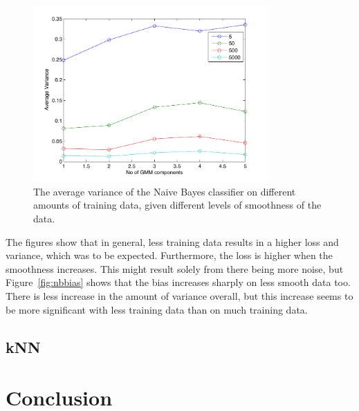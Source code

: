 \documentclass[a4paper]{article}
\begin{document}
\begin{figure}[H!]
    \centering
    \includegraphics[width=0.8\textwidth]{nb_variance_1-5c.pdf}
    \caption{The average variance of the Naive Bayes classifier on different amounts of training data, given different levels of smoothness of the data. \label{fig:nbvar}}
\end{figure}

The figures show that in general, less training data results in a higher loss and variance, which was to be expected. Furthermore, the loss is higher when the smoothness increases. This might result solely from there being more noise, but Figure~\ref{fig:nbbias} shows that the bias increases sharply on less smooth data too.
There is less increase in the amount of variance overall, but this increase seems to be more significant with less training data than on much training data.

\subsection{kNN}


\section{Conclusion}



\end{document}
